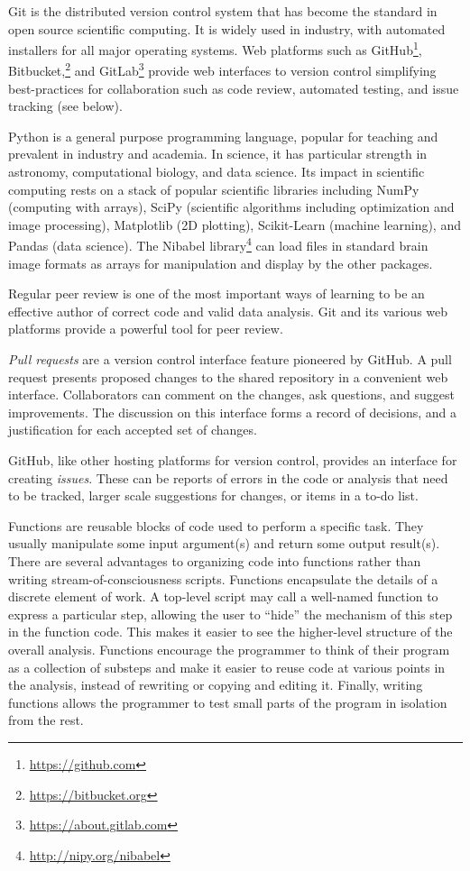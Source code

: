 Git is the distributed version control system that has become the standard in
open source scientific computing. It is widely used in industry, with automated
installers for all major operating systems.
Web platforms such as GitHub\footnote{\url{https://github.com}},
Bitbucket,\footnote{\url{https://bitbucket.org}} and
GitLab\footnote{\url{https://about.gitlab.com}} provide web interfaces to
version control simplifying best-practices for collaboration such as code
review, automated testing, and issue tracking (see below).

Python is a general purpose programming language,
popular for teaching and prevalent in industry and academia.
In science, it has particular strength in
astronomy, computational biology, and data science.
Its impact in scientific computing rests on a stack of popular scientific
libraries including NumPy (computing with arrays), SciPy (scientific
algorithms including optimization and image processing), Matplotlib (2D
plotting), Scikit-Learn (machine learning), and Pandas (data science).  The
Nibabel library\footnote{\url{http://nipy.org/nibabel}\label{nibabel}} can
load files in standard brain image formats as arrays for manipulation and
display by the other packages.

Regular peer review is one of the most important ways of learning
to be an effective author of correct code and valid data analysis.  Git and its
various web platforms provide a powerful tool for peer review.

\emph{Pull requests} are a version control interface feature pioneered by
GitHub.  A pull request presents proposed changes to the shared
repository in a convenient web interface. Collaborators can comment on the
changes, ask questions, and suggest improvements.  The discussion on this
interface forms a record of decisions, and a justification for each accepted
set of changes.

GitHub, like other hosting platforms for version control, provides an
interface for creating \emph{issues}.  These can be reports of errors in the
code or analysis that need to be tracked, larger scale suggestions for
changes, or items in a to-do list.

Functions are reusable blocks of code used to perform a specific task.
They usually manipulate some input argument(s) and return some output
result(s).
There are several advantages to organizing code into functions rather
than writing stream-of-consciousness scripts.
Functions encapsulate the details of a discrete element of
work.  A top-level script may call a well-named function to express a
particular step, allowing the user to ``hide'' the mechanism of this step in
the function code.  This makes it easier to see the higher-level structure of
the overall analysis.
Functions encourage the programmer to think of their program as a collection
of substeps and make it easier to reuse code at various points in the
analysis, instead of rewriting or copying and editing it.
Finally, writing functions allows the programmer to test small parts of the
program in isolation from the rest.

